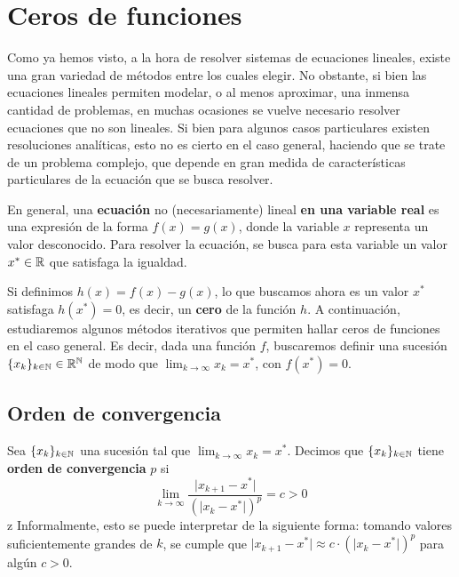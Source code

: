 
\section{Ceros de funciones}

Como ya hemos visto, a la hora de resolver sistemas de ecuaciones lineales,
existe una gran variedad de métodos entre los cuales elegir. No obstante, si
bien las ecuaciones lineales permiten modelar, o al menos aproximar, una
inmensa cantidad de problemas, en muchas ocasiones se vuelve necesario
resolver ecuaciones que no son lineales. Si bien para algunos casos
particulares existen resoluciones analíticas, esto no es cierto en el caso
general, haciendo que se trate de un problema complejo, que depende en gran
medida de características particulares de la ecuación que se busca resolver.

En general, una \textbf{ecuación} no (necesariamente) lineal \textbf{en una
variable real} es una expresión de la forma $f(x) = g(x)$, donde la variable
$x$ representa un valor desconocido. Para resolver la ecuación, se busca
para esta variable un valor $x^\ast \in \mathbb{R}$ que satisfaga la igualdad.

Si definimos $h(x) = f(x) - g(x)$, lo que buscamos ahora es un valor $x^\ast$
satisfaga $h(x^\ast) = 0$, es decir, un \textbf{cero} de la función $h$.
A continuación, estudiaremos algunos métodos iterativos que permiten hallar
ceros de funciones en el caso general. Es decir, dada una función $f$,
buscaremos definir una sucesión
$\lbrace x_k \rbrace_{k \in \mathbb{N}} \in \mathbb{R}^{\mathbb{N}}$ de modo que
$\lim_{k \to \infty} x_k = x^\ast$, con $f(x^\ast) = 0$.

\subsection{Orden de convergencia}

Sea $\lbrace x_k \rbrace_{k \in \mathbb{N}}$ una sucesión tal que
$\lim_{k \to \infty} x_k = x^\ast$. Decimos que
$\lbrace x_k \rbrace_{k \in \mathbb{N}}$ tiene \textbf{orden de convergencia} $p$
si
\[ \lim_{k \to \infty} \frac{\lvert x_{k+1} - x^\ast \rvert}
    {\left( \lvert x_k - x^\ast \rvert \right)^p} = c > 0 \]
z
Informalmente, esto se puede interpretar de la siguiente forma: tomando
valores suficientemente grandes de $k$, se cumple que
$\lvert x_{k+1} - x^\ast \rvert \approx c \cdot \left(\lvert x_k - x^\ast \rvert\right)^p$
para algún $c > 0$.

